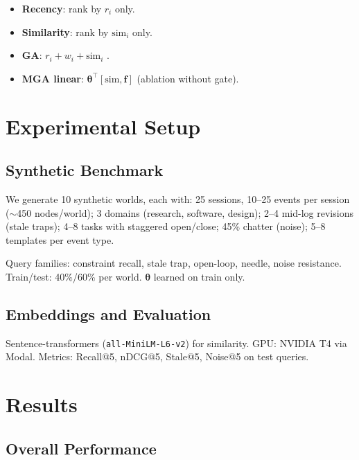 \documentclass{article}
\begin{document}
\begin{itemize}[leftmargin=2em,itemsep=2pt]
\item \textbf{Recency}: rank by $r_i$ only.
\item \textbf{Similarity}: rank by $\text{sim}_i$ only.
\item \textbf{GA}: $r_i + w_i + \text{sim}_i$ \citep{park2023generative}.
\item \textbf{MGA linear}: $\boldsymbol{\theta}^\top [\text{sim}, \mathbf{f}]$ (ablation without gate).
\end{itemize}

\section{Experimental Setup}

\subsection{Synthetic Benchmark}

We generate 10 synthetic worlds, each with: 25 sessions, 10--25 events per session ($\sim$450 nodes/world); 3 domains (research, software, design); 2--4 mid-log revisions (stale traps); 4--8 tasks with staggered open/close; 45\% chatter (noise); 5--8 templates per event type.

Query families: constraint recall, stale trap, open-loop, needle, noise resistance. Train/test: 40\%/60\% per world. $\boldsymbol{\theta}$ learned on train only.

\subsection{Embeddings and Evaluation}

Sentence-transformers (\texttt{all-MiniLM-L6-v2}) for similarity. GPU: NVIDIA T4 via Modal. Metrics: Recall@5, nDCG@5, Stale@5, Noise@5 on test queries.

\section{Results}

\subsection{Overall Performance}
\end{document}
